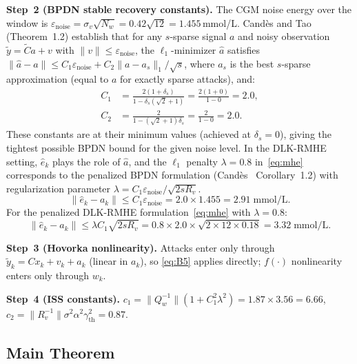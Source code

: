 \documentclass[journal,twoside]{IEEEtran}
\newcommand{\ehat}{\hat{e}}
\begin{document}
\textbf{Step~2 (BPDN stable recovery constants).}
The CGM noise energy over the window is
$\varepsilon_\mathrm{noise} = \sigma_v\sqrt{N_w} = 0.42\sqrt{12} = 1.455$\,mmol/L.
Candès and Tao~\cite{candes2006} (Theorem~1.2) establish that for any
$s$-sparse signal $a$ and noisy observation $\tilde y = \tilde Ca + v$
with $\|v\|\leq\varepsilon_\mathrm{noise}$, the $\ell_1$-minimizer $\hat a$
satisfies $\|\hat a - a\|\leq C_1\varepsilon_\mathrm{noise} + C_2\|a-a_s\|_1/\sqrt{s}$,
where $a_s$ is the best $s$-sparse approximation (equal to $a$ for exactly
sparse attacks), and:
\begin{align}
  C_1 &= \frac{2(1+\delta_s)}{1-\delta_s(\sqrt{2}+1)}
       = \frac{2(1+0)}{1-0} = 2.0,\label{eq:B2}\\
  C_2 &= \frac{2}{1-(\sqrt{2}+1)\delta_s}
       = \frac{2}{1-0} = 2.0.\label{eq:B3}
\end{align}
These constants are at their minimum values (achieved at $\delta_s{=}0$),
giving the tightest possible BPDN bound for the given noise level.
In the DLK-RMHE setting, $\ehat_k$ plays the role of $\hat a$,
and the $\ell_1$ penalty $\lambda{=}0.8$ in~\eqref{eq:mhe} corresponds to
the penalized BPDN formulation (Candès~\cite{candes2006} Corollary~1.2)
with regularization parameter $\lambda = C_1\varepsilon_\mathrm{noise}/\sqrt{2sR_v}$.
\begin{equation}\label{eq:B4}
  \|\ehat_k{-}a_k\| \leq C_1\varepsilon_\mathrm{noise} = 2.0\times1.455 = 2.91\;\text{mmol/L}.
\end{equation}
For the penalized DLK-RMHE formulation~\eqref{eq:mhe} with $\lambda{=}0.8$:
\begin{equation}\label{eq:B5}
  \|\ehat_k{-}a_k\| \leq \lambda C_1\sqrt{2sR_v}
  = 0.8\times2.0\times\sqrt{2\times12\times0.18} = 3.32\;\text{mmol/L}.
\end{equation}

\textbf{Step~3 (Hovorka nonlinearity).}
Attacks enter only through $\tilde y_k=Cx_k+v_k+a_k$ (linear in $a_k$), so
\eqref{eq:B5} applies directly; $f(\cdot)$ nonlinearity enters only through $w_k$.

\textbf{Step~4 (ISS constants).}
$c_1{=}\|Q_w^{-1}\|(1+C_1^2\lambda^2)=1.87\times3.56=6.66$,
$c_2{=}\|R_v^{-1}\|\sigma^2\alpha^2\gamma_\mathrm{th}^2=0.87$.

\subsection{Main Theorem}
\end{document}
